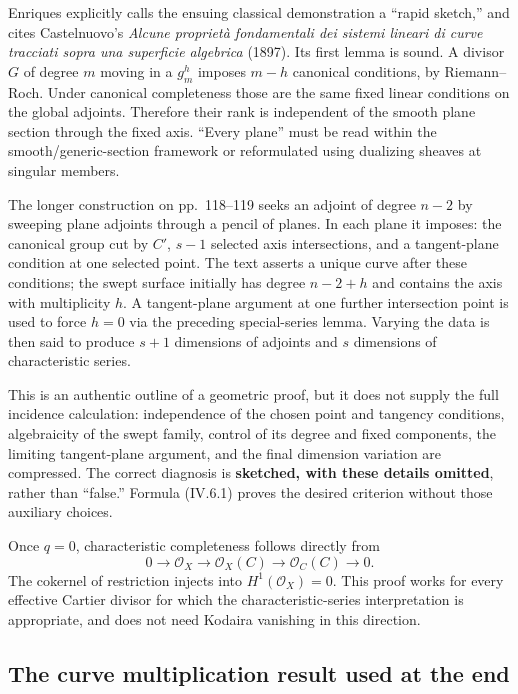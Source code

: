 Enriques explicitly calls the ensuing classical demonstration a ``rapid sketch,'' and cites Castelnuovo's \emph{Alcune proprietà fondamentali dei sistemi lineari di curve tracciati sopra una superficie algebrica} (1897). Its first lemma is sound. A divisor \(G\) of degree \(m\) moving in a \(g_m^h\) imposes \(m-h\) canonical conditions, by Riemann--Roch. Under canonical completeness those are the same fixed linear conditions on the global adjoints. Therefore their rank is independent of the smooth plane section through the fixed axis. ``Every plane'' must be read within the smooth/generic-section framework or reformulated using dualizing sheaves at singular members.

The longer construction on pp.~118--119 seeks an adjoint of degree \(n-2\) by sweeping plane adjoints through a pencil of planes. In each plane it imposes: the canonical group cut by \(C'\), \(s-1\) selected axis intersections, and a tangent-plane condition at one selected point. The text asserts a unique curve after these conditions; the swept surface initially has degree \(n-2+h\) and contains the axis with multiplicity \(h\). A tangent-plane argument at one further intersection point is used to force \(h=0\) via the preceding special-series lemma. Varying the data is then said to produce \(s+1\) dimensions of adjoints and \(s\) dimensions of characteristic series.

This is an authentic outline of a geometric proof, but it does not supply the full incidence calculation: independence of the chosen point and tangency conditions, algebraicity of the swept family, control of its degree and fixed components, the limiting tangent-plane argument, and the final dimension variation are compressed. The correct diagnosis is \textbf{sketched, with these details omitted}, rather than ``false.'' Formula (IV.6.1) proves the desired criterion without those auxiliary choices.

Once \(q=0\), characteristic completeness follows directly from \[
 0\longrightarrow\mathcal O_X\longrightarrow\mathcal O_X(C)
 \longrightarrow\mathcal O_C(C)\longrightarrow0.
\] The cokernel of restriction injects into \(H^1(\mathcal O_X)=0\). This proof works for every effective Cartier divisor for which the characteristic-series interpretation is appropriate, and does not need Kodaira vanishing in this direction.

\subsection{The curve multiplication result used at the end}

